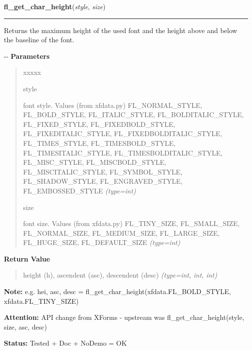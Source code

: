 \hspace{.8\funcindent}\begin{boxedminipage}{\funcwidth}

    \raggedright \textbf{fl\_get\_char\_height}(\textit{style}, \textit{size})

    \vspace{-1.5ex}

    \rule{\textwidth}{0.5\fboxrule}
\setlength{\parskip}{2ex}

Returns the maximum height of the used font and the height above and
below the baseline of the font.

-{}-
\setlength{\parskip}{1ex}
      \textbf{Parameters}
      \vspace{-1ex}

      \begin{quote}
        \begin{Ventry}{xxxxx}

          \item[style]


font style. Values (from xfdata.py) FL\_NORMAL\_STYLE, FL\_BOLD\_STYLE,
FL\_ITALIC\_STYLE, FL\_BOLDITALIC\_STYLE, FL\_FIXED\_STYLE,
FL\_FIXEDBOLD\_STYLE, FL\_FIXEDITALIC\_STYLE, FL\_FIXEDBOLDITALIC\_STYLE,
FL\_TIMES\_STYLE, FL\_TIMESBOLD\_STYLE, FL\_TIMESITALIC\_STYLE,
FL\_TIMESBOLDITALIC\_STYLE, FL\_MISC\_STYLE, FL\_MISCBOLD\_STYLE,
FL\_MISCITALIC\_STYLE, FL\_SYMBOL\_STYLE, FL\_SHADOW\_STYLE,
FL\_ENGRAVED\_STYLE, FL\_EMBOSSED\_STYLE
            {\it (type=int)}

          \item[size]


font size. Values (from xfdata.py) FL\_TINY\_SIZE, FL\_SMALL\_SIZE,
FL\_NORMAL\_SIZE, FL\_MEDIUM\_SIZE, FL\_LARGE\_SIZE, FL\_HUGE\_SIZE,
FL\_DEFAULT\_SIZE
            {\it (type=int)}

        \end{Ventry}

      \end{quote}

      \textbf{Return Value}
    \vspace{-1ex}

      \begin{quote}

height (h), ascendent (asc), descendent (desc)
      {\it (type=int, int, int)}

      \end{quote}

\textbf{Note:} 
e.g. hei, asc, desc = fl\_get\_char\_height(xfdata.FL\_BOLD\_STYLE,
xfdata.FL\_TINY\_SIZE)


\textbf{Attention:} 
API change from XForms - upstream was
fl\_get\_char\_height(style, size, asc, desc)


\textbf{Status:} 
Tested + Doc + NoDemo = OK


    \end{boxedminipage}

